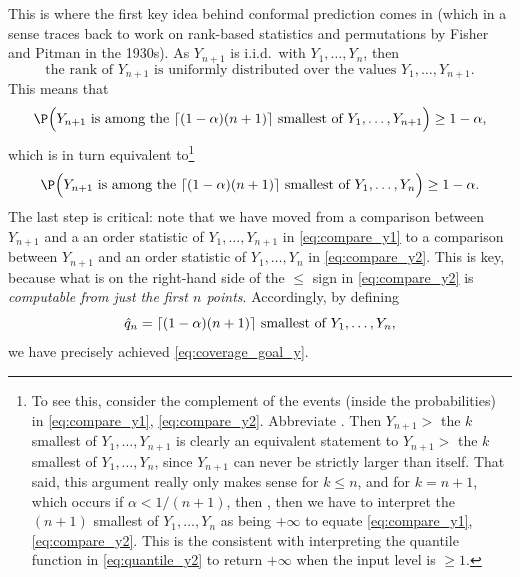 \documentclass{article}
\begin{document}
This is where the first key idea behind conformal prediction comes in (which in
a sense traces back to work on rank-based statistics and permutations by Fisher
and Pitman in the 1930s). As $Y_{n+1}$ is i.i.d.\ with $Y_1,\dots,Y_n$, then  
\begin{equation}
\label{eq:rank_uniform_y}
\text{the rank of $Y_{n+1}$ is uniformly distributed over the values 
  $Y_1,\dots,Y_{n+1}$}.
\end{equation}
This means that 
\begin{equation}
\label{eq:compare_y1}
\P\Big( \text{$Y_{n+1}$ is among the $\lceil (1-\alpha)(n+1) \rceil$ smallest of
  $Y_1,\dots,Y_{n+1}$} \Big) \geq 1-\alpha, 
\end{equation}
which is in turn equivalent to\footnote{To see this, consider the complement of
  the events (inside the probabilities) in \eqref{eq:compare_y1},
  \eqref{eq:compare_y2}. Abbreviate . Then $Y_{n+1} >$ the $k$ smallest of $Y_1,\dots,Y_{n+1}$ is
  clearly an equivalent statement to $Y_{n+1} >$ the $k$ smallest of
  $Y_1,\dots,Y_n$, since $Y_{n+1}$ can never be strictly larger than
  itself. That said, this argument really only makes sense for $k \leq n$, and
  for $k = n+1$, which occurs if $\alpha < 1/(n+1)$, then , then we have to interpret the $(n+1)$
  smallest of $Y_1,\dots,Y_n$ as being $+\infty$ to equate
  \eqref{eq:compare_y1}, \eqref{eq:compare_y2}. This is the consistent with
  interpreting the quantile function in \eqref{eq:quantile_y2} to return
  $+\infty$ when the input level is $\geq 1$.}          
\begin{equation}
\label{eq:compare_y2}
\P\Big( \text{$Y_{n+1}$ is among the $\lceil (1-\alpha)(n+1) \rceil$ smallest of 
  $Y_1,\dots,Y_n$} \Big) \geq 1-\alpha.
\end{equation}
The last step is critical: note that we have moved from a comparison between 
$Y_{n+1}$ and a an order statistic of $Y_1,\dots,Y_{n+1}$ in
\eqref{eq:compare_y1} to a comparison between $Y_{n+1}$ and an order statistic
of $Y_1,\dots,Y_n$ in \eqref{eq:compare_y2}. This is key, because what is on the
right-hand side of the $\leq$ sign in \eqref{eq:compare_y2} is \emph{computable
  from just the first $n$ points}. Accordingly, by defining  
\begin{equation}
\label{eq:quantile_y1}
\text{$\hat{q}_n = \lceil (1-\alpha)(n+1) \rceil$ smallest of $Y_1,\dots,Y_n$}, 
\end{equation}
we have precisely achieved \eqref{eq:coverage_goal_y}. 
\end{document}
